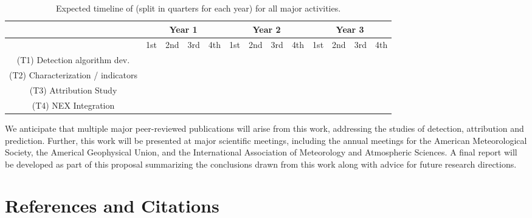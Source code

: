 \documentclass[11pt]{article}
\begin{document}
\begin{table}
\begin{tabular}{c||c|c|c|c||c|c|c|c||c|c|c|c|}
& \multicolumn{4}{c}{Year 1} & \multicolumn{4}{c}{Year 2} & \multicolumn{4}{c}{Year 3}  \\
\hline
         & 1st & 2nd & 3rd & 4th & 1st & 2nd & 3rd & 4th  & 1st & 2nd & 3rd & 4th \\
\hline
\hline
(T1) Detection algorithm dev. & \cellcolor{red!35} & \cellcolor{red!35} & \cellcolor{red!35} & \cellcolor{red!35} & & & & & & & &  \\
\hline
(T2) Characterization / indicators  & \cellcolor{green!35} & \cellcolor{green!35} & \cellcolor{green!35} &  \cellcolor{green!35}  & \cellcolor{green!35} & \cellcolor{green!35} & \cellcolor{green!35} & \cellcolor{green!35} & \cellcolor{green!35} & \cellcolor{green!35} & & \\
\hline
(T3) Attribution Study & & & & & \cellcolor{blue!35} & \cellcolor{blue!35} & \cellcolor{blue!35} &  \cellcolor{blue!35}  & \cellcolor{blue!35} & \cellcolor{blue!35} & & \\
\hline
(T4) NEX Integration  & & & & & & & \cellcolor{cyan!35} &  \cellcolor{cyan!35}  & \cellcolor{cyan!35} & \cellcolor{cyan!35} & \cellcolor{cyan!35} &  \cellcolor{cyan!35} \\
\hline
\end{tabular}
\caption{Expected timeline of (split in quarters for each year) for all major activities.} \label{tab:ExpectedTimeline}
\end{table}

We anticipate that multiple major peer-reviewed publications will arise from this work, addressing the studies of detection, attribution and prediction. Further, this work will be presented at major scientific meetings, including the annual meetings for the American Meteorological Society, the Americal Geophysical Union, and the International Association of Meteorology and Atmospheric Sciences.  A final report will be developed as part of this proposal summarizing the conclusions drawn from this work along with advice for future research directions.

\clearpage

\section{References and Citations}

\vspace{-1cm}


\end{document}
